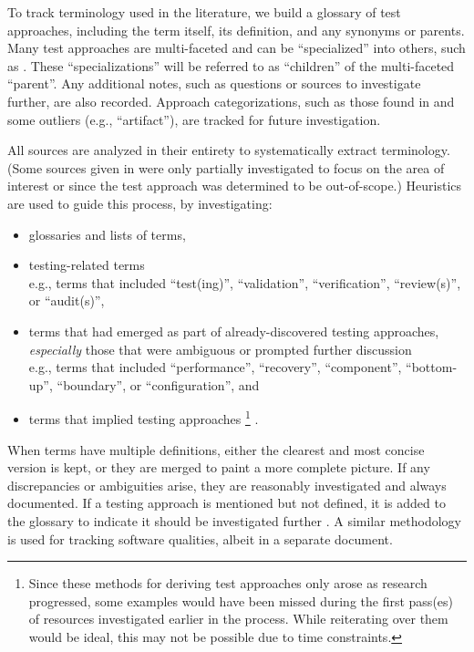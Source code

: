 To track terminology used in the literature, we build a glossary of test
approaches, including the term itself, its definition, and
any synonyms or parents. Many test approaches are multi-faceted and can be
``specialized'' into others, such as . These
``specializations'' will be referred to as ``children'' of the multi-faceted
``parent''. Any additional notes, such as questions or sources to investigate
further, are also recorded. Approach categorizations, such as those found in
 and some outliers (e.g., ``artifact''), are tracked
for future investigation.

All sources are analyzed in their entirety to systematically extract
terminology. (Some sources given in 
were only partially investigated to focus on the area of interest or since
the test approach was determined to be out-of-scope.)
Heuristics are used to guide this process, by investigating:

\begin{itemize}
      \item glossaries and lists of terms,
      \item testing-related terms\\
            e.g., terms that included ``test(ing)'', ``validation'',
            ``verification'', ``review(s)'', or ``audit(s)'',
      \item terms that had emerged as part of already-discovered
            testing approaches, \emph{especially} those that were ambiguous
            or prompted further discussion\\
            e.g., terms that included ``performance'', ``recovery'',
            ``component'', ``bottom-up'', ``boundary'', or ``configuration'', and
      \item terms that implied testing approaches%
            \ifnotpaper\footnote{
                        Since these methods for deriving test approaches only arose
                        as research progressed, some examples would have been missed
                        during the first pass(es) of resources investigated earlier
                        in the process. While reiterating over them would be ideal,
                        this may not be possible due to time constraints.
                  }\fi%
            .
\end{itemize}

When terms have multiple definitions, either the clearest and most concise
version is kept, or they are merged to paint a more complete picture.
If any discrepancies or ambiguities
arise, they are reasonably investigated and always documented. If a
testing approach is mentioned but not defined, it is added to the
glossary to indicate it should be investigated further%
. A similar methodology
is used for tracking software qualities, albeit in a separate
document.

